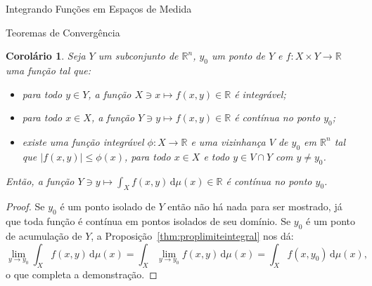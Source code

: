 \documentclass[oneside,final,11pt]{amsbook}
\newcommand{\R}{\mathds R}
\newcommand{\dd}{\mathrm d}
\theoremstyle{remark}\newtheorem{exercise}{Exercício}[chapter]
\theoremstyle{remark}\newtheorem{*exercise}[exercise]{\hbox to 0pt{\hskip 0pt minus 1fil*}Exercício}
\theoremstyle{definition}\newtheorem{exdefin}{Definição}[chapter]
\theoremstyle{plain}\newtheorem{teo}{Teorema}[section]
\theoremstyle{plain}\newtheorem{lem}[teo]{Lema}
\theoremstyle{plain}\newtheorem{prop}[teo]{Proposição}
\theoremstyle{plain}\newtheorem{cor}[teo]{Corolário}
\theoremstyle{definition}\newtheorem{defin}[teo]{Definição}
\theoremstyle{remark}\newtheorem{rem}[teo]{Observação}
\theoremstyle{definition}\newtheorem{notation}[teo]{Notação}
\theoremstyle{definition}\newtheorem{convention}[teo]{Convenção}
\theoremstyle{definition}\newtheorem{example}[teo]{Exemplo}
\numberwithin{section}{chapter}
\numberwithin{equation}{section}
\begin{document}
\begin{chapter}{Integrando Funções em Espaços de Medida}
\begin{section}{Teoremas de Convergência}
\begin{cor}
Seja $Y$ um subconjunto de $\R^n$, $y_0$ um ponto de $Y$ e $f:X\times Y\to\R$ uma função tal que:
\begin{itemize}
\item para todo $y\in Y$, a função $X\ni x\mapsto f(x,y)\in\R$ é integrável;
\item para todo $x\in X$, a função $Y\ni y\mapsto f(x,y)\in\R$ é contínua no ponto $y_0$;
\item existe uma função integrável $\phi:X\to\R$ e uma vizinhança $V$ de $y_0$ em $\R^n$
tal que $\vert f(x,y)\vert\le\phi(x)$, para todo $x\in X$ e todo $y\in V\cap Y$ com $y\ne y_0$.
\end{itemize}
Então, a função $Y\ni y\mapsto\int_Xf(x,y)\,\dd\mu(x)\in\R$ é contínua no ponto $y_0$.
\end{cor}
\begin{proof}
Se $y_0$ é um ponto isolado de $Y$ então não há nada para ser mostrado, já que toda função é contínua
em pontos isolados de seu domínio. Se $y_0$ é um ponto de acumulação de $Y$, a Proposição~\ref{thm:proplimiteintegral}
nos dá:
\[\lim_{y\to y_0}\int_Xf(x,y)\,\dd\mu(x)=\int_X\lim_{y\to y_0}f(x,y)\,\dd\mu(x)
=\int_Xf(x,y_0)\,\dd\mu(x),\]
o que completa a demonstração.
\end{proof}


\end{section}
\end{chapter}
\end{document}
